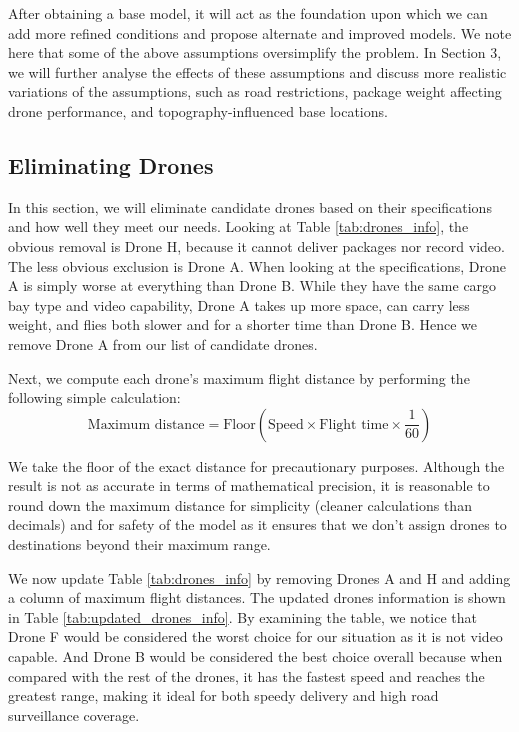 After obtaining a base model, it will act as the foundation upon which we can add more refined conditions and propose alternate and improved models. We note here that some of the above assumptions oversimplify the problem. In Section 3, we will further analyse the effects of these assumptions and discuss more realistic variations of the assumptions, such as road restrictions, package weight affecting drone performance, and topography-influenced base locations.

\subsection{Eliminating Drones}
In this section, we will eliminate candidate drones based on their specifications and how well they meet our needs. Looking at Table \ref{tab:drones_info}, the obvious removal is Drone H, because it cannot deliver packages nor record video. The less obvious exclusion is Drone A. When looking at the specifications, Drone A is simply worse at everything than Drone B. While they have the same cargo bay type and video capability, Drone A takes up more space, can carry less weight, and flies both slower and for a shorter time than Drone B. Hence we remove Drone A from our list of candidate drones.

Next, we compute each drone's maximum flight distance by performing the following simple calculation:
\begin{equation*}
    \text{Maximum distance} = \text{Floor}\left(\text{Speed} \times \text{Flight time} \times \frac{1}{60}\right)
\end{equation*}

We take the floor of the exact distance for precautionary purposes. Although the result is not as accurate in terms of mathematical precision, it is reasonable to round down the maximum distance for simplicity (cleaner calculations than decimals) and for safety of the model as it ensures that we don't assign drones to destinations beyond their maximum range.

We now update Table \ref{tab:drones_info} by removing Drones A and H and adding a column of maximum flight distances. The updated drones information is shown in Table \ref{tab:updated_drones_info}. By examining the table, we notice that Drone F would be considered the worst choice for our situation as it is not video capable. And Drone B would be considered the best choice overall because when compared with the rest of the drones, it has the fastest speed and reaches the greatest range, making it ideal for both speedy delivery and high road surveillance coverage. 

